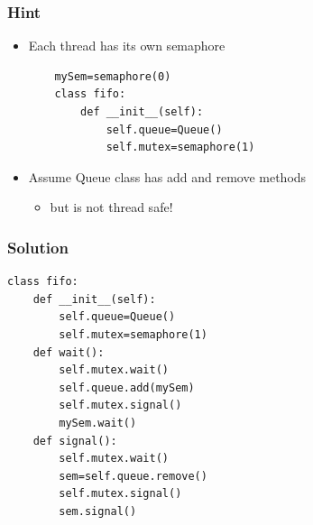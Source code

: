 \documentclass{beamer}
\begin{document}
\begin{frame}[fragile]
	\frametitle{Hint}
\begin{itemize}
	\item Each thread has its own semaphore
	\begin{verbatim}
    mySem=semaphore(0)
    class fifo:
        def __init__(self):
            self.queue=Queue()
            self.mutex=semaphore(1)
    \end{verbatim}
	\item Assume Queue class has add and remove methods
		\begin{itemize}
			\item but is not thread safe!
		\end{itemize}
\end{itemize}
\end{frame}
\begin{frame}[fragile]
	\frametitle{Solution}
\begin{verbatim}
class fifo:
    def __init__(self):
        self.queue=Queue()
        self.mutex=semaphore(1)
    def wait():
        self.mutex.wait()
        self.queue.add(mySem)
        self.mutex.signal()
        mySem.wait()
    def signal():
        self.mutex.wait()
        sem=self.queue.remove()
        self.mutex.signal()
        sem.signal()
\end{verbatim}
\end{frame}
\end{document}

